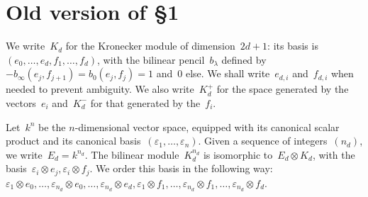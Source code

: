 \documentclass{article}
\begin{document}
% 
% 
% 
% 
% 



\section{Old version of §1}

We write~$K_d$ for the Kronecker module of dimension~$2d+1$: its basis
is~$(e_0, …, e_d, f_1, …, f_d)$, with the bilinear pencil~$b_{λ}$ defined
by~$-b_{∞} (e_j, f_{j+1}) = b_{0} (e_j, f_j) = 1$ and~$0$ else. We shall
write~$e_{d,i}$ and~$f_{d,i}$ when needed to prevent ambiguity. We also
write~$K_d^+$ for the space generated by the vectors~$e_i$ and~$K_d^-$
for that generated by the~$f_i$.

Let~$k^n$ be the $n$-dimensional vector space, equipped with its
canonical scalar product and its canonical basis~$(ε_1, …, ε_n)$. Given a
sequence of integers~$(n_d)$, we write~$E_d = k^{n_d}$. The
bilinear module~$K_d^{n_d}$ is isomorphic to~$E_d ⊗ K_d$, with the basis~$ε_i ⊗
e_j, ε_i ⊗ f_j$. We order this basis in the following way: $ε_1 ⊗ e_0, …,
ε_{n_d} ⊗ e_0, …, ε_{n_d} ⊗ e_d, ε_1 ⊗ f_1, …, ε_{n_d} ⊗ f_1, …, ε_{n_d} ⊗ f_d$.
\end{document}
